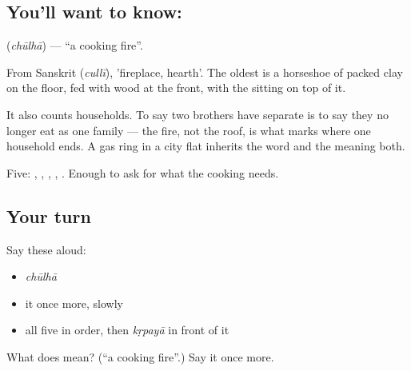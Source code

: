 \subsection*{You'll want to know: }
\textbf{} (\emph{chūlhā}) — \textquotedblleft{}a cooking fire\textquotedblright{}.

From Sanskrit  (\emph{cullī}), 'fireplace, hearth'. The oldest  is a horseshoe of packed clay on the floor, fed with wood at the front, with the  sitting on top of it.

It also counts households. To say two brothers have separate  is to say they no longer eat as one family — the fire, not the roof, is what marks where one household ends. A gas ring in a city flat inherits the word and the meaning both.

\begin{grammarlens}[title={What you've built}]
Five: , , , , . Enough to ask for what the cooking needs.
\end{grammarlens}

\subsection*{Your turn}
Say these aloud:

\begin{itemize}
\raggedright
  \item \emph{chūlhā}
  \item it once more, slowly
  \item all five in order, then \emph{kṛpayā} in front of it
\end{itemize}

\begin{tcolorbox}[breakable,colback=teal!4,colframe=teal!35!black,title={Before you move on}]
What does  mean? (\textquotedblleft{}a cooking fire\textquotedblright{}.) Say it once more.
\end{tcolorbox}
